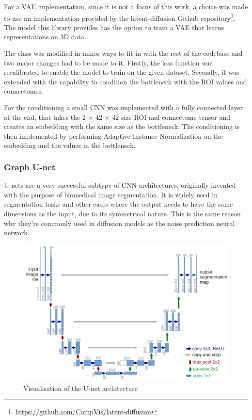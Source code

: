 	For a VAE implementation, since it is not a focus of this work, a choice was made to use an implementation provided by the latent-diffusion Github repository\footnote{\url{https://github.com/CompVis/latent-diffusion}}. The model this library provides has the option to train a VAE that learns representations on 3D data. 
	
	The class was modified in minor ways to fit in with the rest of the codebase and  two major changes had to be made to it. Firstly,  the loss function was recalibrated to enable the model to train on the given dataset. Secondly, it was extended with the capability to condition the bottleneck with the ROI values and connectomes. 
	
	For the conditioning a small CNN was implemented with a fully connected layer at the end, that takes the 2 × 42 × 42 size ROI and connectome tensor and creates an embedding with the same size as the bottleneck. The conditioning is then implemented by performing Adaptive Instance Normalization\cite{huang2017arbitrary} on the embedding and the values in the bottleneck.
	
	\subsubsection{Graph U-net}
	
	U-nets are a very successful subtype of CNN architectures, originally invented with the purpose of biomedical image segmentation\cite{ronneberger2015u}. It is widely used in segmentation tasks and other cases where the output needs to have the same dimensions as the input, due to its symmetrical nature. This is the same reason why they're commonly used in diffusion models as the noise prediction neural network\cite{ho2020denoising}.
	
	\begin{figure}[!h]
		\centering
		\label{fig:unet}		
		\includegraphics[width=\textwidth]{figures/u-net-architecture.png}
		\caption{Visualisation of the U-net architecture\cite{ronneberger2015u}}
	\end{figure}
	
